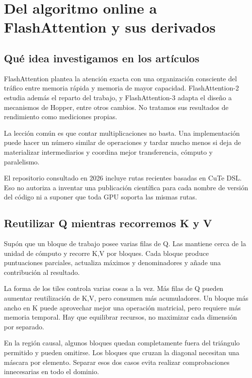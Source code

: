 \documentclass[12pt,a4paper,oneside]{report}
\begin{document}
\chapter{Del algoritmo online a FlashAttention y sus derivados}
\label{ch:flash}
\section{Qué idea investigamos en los artículos}
FlashAttention plantea la atención exacta con una organización consciente del tráfico entre memoria rápida y memoria de mayor capacidad. FlashAttention-2 estudia además el reparto del trabajo, y FlashAttention-3 adapta el diseño a mecanismos de Hopper, entre otros cambios. No tratamos sus resultados de rendimiento como mediciones propias. \cite{flash1,flash2,flash3}

La lección común es que contar multiplicaciones no basta. Una implementación puede hacer un número similar de operaciones y tardar mucho menos si deja de materializar intermediarios y coordina mejor transferencia, cómputo y paralelismo.

El repositorio consultado en 2026 incluye rutas recientes basadas en CuTe DSL. Eso no autoriza a inventar una publicación científica para cada nombre de versión del código ni a suponer que toda GPU soporta las mismas rutas. \cite{flash-repo}

\section{Reutilizar Q mientras recorremos K y V}
Supón que un bloque de trabajo posee varias filas de Q. Las mantiene cerca de la unidad de cómputo y recorre K,V por bloques. Cada bloque produce puntuaciones parciales, actualiza máximos y denominadores y añade una contribución al resultado.

La forma de los tiles controla varias cosas a la vez. Más filas de Q pueden aumentar reutilización de K,V, pero consumen más acumuladores. Un bloque más ancho en K puede aprovechar mejor una operación matricial, pero requiere más memoria temporal. Hay que equilibrar recursos, no maximizar cada dimensión por separado.

\begin{center}
\end{center}
En la región causal, algunos bloques quedan completamente fuera del triángulo permitido y pueden omitirse. Los bloques que cruzan la diagonal necesitan una máscara por elemento. Separar esos dos casos evita realizar comprobaciones innecesarias en todo el dominio.
\end{document}
